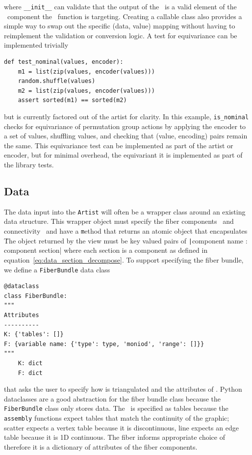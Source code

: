 \documentclass[../main.tex]{subfiles}
\begin{document}
where \texttt{__init__} can validate that the output of the \vchannel\ is a valid element of the \vfiber\ component the \vchannel\ function is targeting. Creating a callable class also provides a simple way to swap out the specific (data, value) mapping without having to reimplement the validation or conversion logic. A test for equivariance can be implemented trivially
\begin{verbatim}
def test_nominal(values, encoder):
    m1 = list(zip(values, encoder(values)))
    random.shuffle(values)
    m2 = list(zip(values, encoder(values)))
    assert sorted(m1) == sorted(m2)
\end{verbatim}
but is currently factored out of the artist for clarity. In this example, \texttt{is_nominal} checks for equivariance of permutation group actions by applying the encoder to a set of values, shuffling values, and checking that (value, encoding) pairs remain the same. This equivariance test can be implemented as part of the artist or encoder, but for minimal overhead, the equivariant it is implemented as part of the library tests.

\subsection{Data \dtotal}
\label{sec:code_data}
The data input into the \texttt{Artist} will often be a wrapper class around an existing data structure. This wrapper object must specify the fiber components \dfiber\ and connectivity \dbase\ and have a \texttt method that returns an atomic object that encapsulates \dsection\. The object returned by the view must be key valued pairs of \texttt|{component name : component section}| where each section is a component as defined in equation~\ref{eq:data_section_decompose}. To support specifying the fiber bundle, we define a \texttt{FiberBundle} data class\cite{DataclassesDataClasses}

\begin{verbatim}
@dataclass
class FiberBundle:
"""
Attributes
----------
K: {'tables': []}
F: {variable name: {'type': type, 'moniod', 'range': []}}
"""
    K: dict 
    F: dict
\end{verbatim}

that asks the user to specify how \dbase is triangulated and the attributes of \dfiber. Python dataclasses are a good abstraction for the fiber bundle class because the \texttt{FiberBundle} class only stores data. The \dbase\ is specified as tables because the \texttt{assembly} functions expect tables that match the continuity of the graphic; scatter expects a vertex table because it is discontinuous, line expects an edge table because it is 1D continuous. The fiber informs appropriate choice of \vchannel\, therefore it is a dictionary of attributes of the fiber components. 
\end{document}
